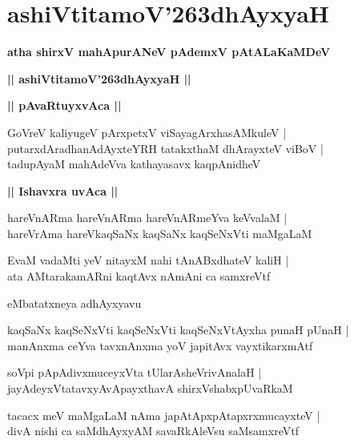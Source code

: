 \documentclass[twoside,12pt,openright]{book}
\def\S{\char'263}
\newcounter{shloka}[chapter]
\def\uvaca#1{\centerline{{\large\textbf{#1}}}}
\begin{document}
\chapter{ashiVtitamoV\S dhAyxyaH}

\begin{center}
{\LARGE\bfseries atha shirxV mahApurANeV pAdemxV pAtALaKaMDeV }
\end{center}

\begin{center}         
{\LARGE\bfseries || ashiVtitamoV\S dhAyxyaH ||}
\end{center}

\uvaca{|| pAvaRtuyxvAca ||}

\begin{shloka}%
GoVreV kaliyugeV pArxpetxV viSayagArxhasAMkuleV |\\
putarxdAradhanAdAyxteYRH tatakxthaM dhArayxteV viBoV |\\
tadupAyaM mahAdeVva kathayasavx kaqpAnidheV
\end{shloka}

\uvaca{|| Ishavxra uvAca ||}

\begin{shloka}%
hareVnARma hareVnARma hareVnARmeYva keVvalaM |\\
hareVrAma hareVkaqSaNx kaqSaNx kaqSeNxVti maMgaLaM 
\end{shloka}

\begin{shloka}%
EvaM vadaMti yeV nitayxM nahi tAnABxdhateV kaliH |\\
ata AMtarakamARni kaqtAvx nAmAni ca samxreVtf
\end{shloka}

\begin{center}
eMbatatxneya adhAyxyavu
\end{center}

\begin{shloka}%
kaqSaNx kaqSeNxVti kaqSeNxVti kaqSeNxVtAyxha punaH pUnaH |\\
manAnxma ceYva tavxnAnxma yoV japitAvx vayxtikarxmAtf 
\end{shloka}

\begin{shloka}%
soVpi pApAdivxmuceyxVta tUlarAsheVrivAnalaH |\\
jayAdeyxVtatavxyAvApayxthavA shirxVshabxpUvaRkaM 
\end{shloka}

\begin{shloka}%
tacacx meV maMgaLaM nAma japAtApxpAtapxrxmucayxteV |\\
divA nishi ca saMdhAyxyAM savaRkAleVsu saMsamxreVtf 
\end{shloka}
\end{document}
